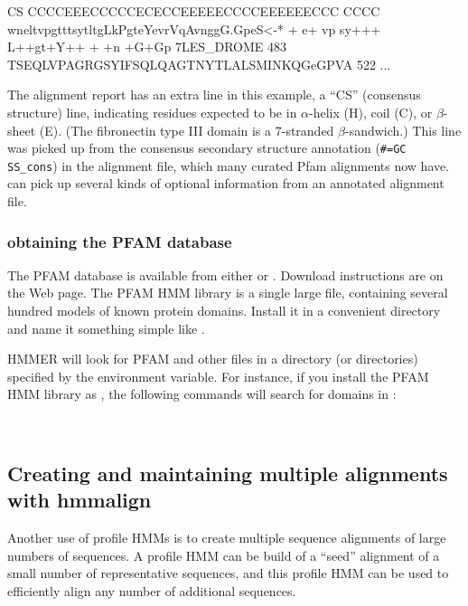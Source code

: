 \begin{sreoutput}
\begin{sreoutput}
                CS CCCCEEECCCCCECECCEEEEECCCCEEEEEECCC CCCC   
                   wneltvpgtttsytltgLkPgteYevrVqAvnggG.GpeS<-*
                   + e+ vp    sy+++ L++gt+Y++ +  +n +G+Gp     
  7LES_DROME   483 TSEQLVPAGRGSYIFSQLQAGTNYTLALSMINKQGeGPVA    522  
...
\end{sreoutput}

The alignment report has an extra line in this example, a ``CS''
(consensus structure) line, indicating residues expected to be in
$\alpha$-helix (H), coil (C), or $\beta$-sheet (E). (The fibronectin
type III domain is a 7-stranded $\beta$-sandwich.) This line was
picked up from the consensus secondary structure annotation
(\verb+#=GC SS_cons+) in the  alignment file, which many
curated Pfam alignments now have.  can pick up several
kinds of optional information from an annotated alignment file.

\subsubsection{obtaining the PFAM database}

The PFAM database is available from either  or
.
Download instructions are on the Web page. The PFAM HMM library is a
single large file, containing several hundred models of known protein
domains. Install it in a convenient directory and name it something
simple like .

HMMER will look for PFAM and other files in a directory (or
directories) specified by the  environment variable.
For instance, if you install the PFAM HMM library as
, the following commands will search
for domains in :

\\


\subsection{Creating and maintaining multiple alignments with hmmalign}

Another use of profile HMMs is to create multiple sequence alignments
of large numbers of sequences. A profile HMM can be build of a
``seed'' alignment of a small number of representative sequences, and
this profile HMM can be used to efficiently align any number of
additional sequences. 


\end{sreoutput}

